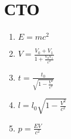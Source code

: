 \documentclass{proc}
\begin{document}
\section{СТО}
\begin{enumerate}
    \item $\displaystyle E=mc^2$
    \item $\displaystyle V = \frac{V_0+V_1}{1+\frac{V_0V_1}{c^2}}$
    \item $\displaystyle t = \frac{t_0}{\sqrt{1-\frac{V^2}{c^2}}}$
    \item $\displaystyle l = l_0\sqrt{1-\frac{V^2}{c^2}}$
    \item $\displaystyle p=\frac{EV}{c^2}$
\end{enumerate}
\end{document}
